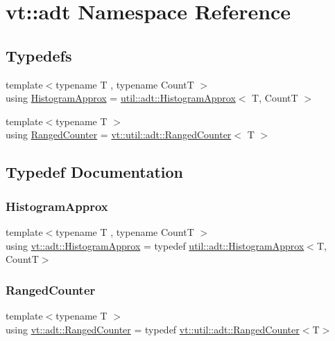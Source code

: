 \hypertarget{namespacevt_1_1adt}{}\section{vt\+:\+:adt Namespace Reference}
\label{namespacevt_1_1adt}
\subsection*{Typedefs}
\begin{DoxyCompactItemize}
\item 
{\footnotesize template$<$typename T , typename CountT $>$ }\\using \hyperlink{namespacevt_1_1adt_a486971e142bc22434d6afe695c43b599}{Histogram\+Approx} = \hyperlink{structvt_1_1util_1_1adt_1_1_histogram_approx}{util\+::adt\+::\+Histogram\+Approx}$<$ T, CountT $>$
\item 
{\footnotesize template$<$typename T $>$ }\\using \hyperlink{namespacevt_1_1adt_a075b41b03183cb280d453f44d5397637}{Ranged\+Counter} = \hyperlink{structvt_1_1util_1_1adt_1_1_ranged_counter}{vt\+::util\+::adt\+::\+Ranged\+Counter}$<$ T $>$
\end{DoxyCompactItemize}


\subsection{Typedef Documentation}
\mbox{\label{namespacevt_1_1adt_a486971e142bc22434d6afe695c43b599}} 
\subsubsection{\texorpdfstring{Histogram\+Approx}{HistogramApprox}}
{\footnotesize\ttfamily template$<$typename T , typename CountT $>$ \\
using \hyperlink{namespacevt_1_1adt_a486971e142bc22434d6afe695c43b599}{vt\+::adt\+::\+Histogram\+Approx} = typedef \hyperlink{structvt_1_1util_1_1adt_1_1_histogram_approx}{util\+::adt\+::\+Histogram\+Approx}$<$T, CountT$>$}

\mbox{\label{namespacevt_1_1adt_a075b41b03183cb280d453f44d5397637}} 
\subsubsection{\texorpdfstring{Ranged\+Counter}{RangedCounter}}
{\footnotesize\ttfamily template$<$typename T $>$ \\
using \hyperlink{namespacevt_1_1adt_a075b41b03183cb280d453f44d5397637}{vt\+::adt\+::\+Ranged\+Counter} = typedef \hyperlink{structvt_1_1util_1_1adt_1_1_ranged_counter}{vt\+::util\+::adt\+::\+Ranged\+Counter}$<$T$>$}

